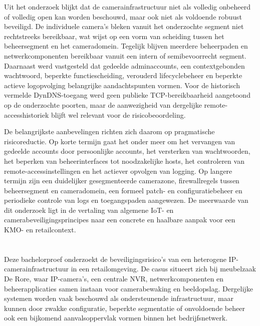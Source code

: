 {    Uit het onderzoek blijkt dat de camerainfrastructuur niet als volledig onbeheerd of volledig open kan worden beschouwd, maar ook niet als voldoende robuust beveiligd. De individuele camera's bleken vanuit het onderzochte segment niet rechtstreeks bereikbaar, wat wijst op een vorm van scheiding tussen het beheersegment en het cameradomein. Tegelijk blijven meerdere beheerpaden en netwerkcomponenten bereikbaar vanuit een intern of semibevoorrecht segment. Daarnaast werd vastgesteld dat gedeelde adminaccounts, een contextgebonden wachtwoord, beperkte functiescheiding, verouderd lifecyclebeheer en beperkte actieve logopvolging belangrijke aandachtspunten vormen. Voor de historisch vermelde DynDNS-toegang werd geen publieke TCP-bereikbaarheid aangetoond op de onderzochte poorten, maar de aanwezigheid van dergelijke remote-accesshistoriek blijft wel relevant voor de risicobeoordeling.
    
    De belangrijkste aanbevelingen richten zich daarom op pragmatische risicoreductie. Op korte termijn gaat het onder meer om het vervangen van gedeelde accounts door persoonlijke accounts, het versterken van wachtwoorden, het beperken van beheerinterfaces tot noodzakelijke hosts, het controleren van remote-accessinstellingen en het actiever opvolgen van logging. Op langere termijn zijn een duidelijker gesegmenteerde camerazone, firewallregels tussen beheersegment en cameradomein, een formeel patch- en configuratiebeheer en periodieke controle van logs en toegangspaden aangewezen. De meerwaarde van dit onderzoek ligt in de vertaling van algemene IoT- en camerabeveiligingsprincipes naar een concrete en haalbare aanpak voor een KMO- en retailcontext.
    
}{}


\chapter*{}

Deze bachelorproef onderzoekt de beveiligingsrisico's van een heterogene IP-camerainfrastructuur in een retailomgeving. De casus situeert zich bij meubelzaak De Rore, waar IP-camera's, een centrale NVR, netwerkcomponenten en beheerapplicaties samen instaan voor camerabewaking en beeldopslag. Dergelijke systemen worden vaak beschouwd als ondersteunende infrastructuur, maar kunnen door zwakke configuratie, beperkte segmentatie of onvoldoende beheer ook een bijkomend aanvalsoppervlak vormen binnen het bedrijfsnetwerk.

